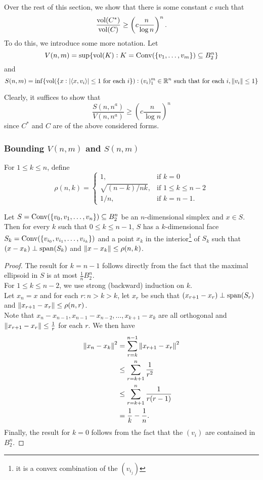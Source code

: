 Over the rest of this section, we show that there is some constant $c$ such that
\[ \frac{\operatorname{vol}(C^*)}{\operatorname{vol}(C)} \geq \left(c \frac{n}{\log n}\right)^n. \]
To do this, we introduce some more notation. Let
\[ V(n,m) = \sup\{\operatorname{vol}(K):K=\operatorname{Conv}(\{v_1,\ldots,v_m\})\subseteq B_2^n\} \]
and
\[ S(n,m) = \inf\{\operatorname{vol}(\{x:|\langle x,v_i\rangle| \leq 1\text{ for each $i$}\}) : (v_i)_1^m\in\mathbb{R}^n\text{ such that for each }i, \left\lVert v_i\right\rVert\leq 1\} \]

Clearly, it suffices to show that
\begin{equation}
\label{eqn: barany furedy}
	\frac{S(n,n^a)}{V(n,n^a)} \geq \left(c \frac{n}{\log n}\right)^n
\end{equation}
since $C^*$ and $C$ are of the above considered forms.\\

\subsubsection{Bounding \texorpdfstring{$V(n,m)$}{V(nm)} and \texorpdfstring{$S(n,m)$}{S(nm)}}

For $1\leq k\leq n$, define
\[
\rho(n,k) = 
\begin{cases}
1, & \text{if }k=0 \\
\sqrt{(n-k)/nk}, & \text{if }1\leq k\leq n-2 \\
1/n, & \text{if }k=n-1.
\end{cases}
\]

\begin{lemma}
\label{rho span bound}
Let $S=\operatorname{Conv}(\{v_0,v_1,\ldots,v_n\})\subseteq B_2^n$ be an $n$-dimensional simplex and $x\in S$. Then for every $k$ such that $0\leq k\leq n-1$, $S$ has a $k$-dimensional face $S_k = \operatorname{Conv}(\{v_{i_0},v_{i_1},\ldots,v_{i_k}\})$ and a point $x_k$ in the interior\footnote{it is a convex combination of the $(v_{i_j})$} of $S_k$ such that $(x-x_k) \perp \operatorname{span}(S_k)$ and $\left\lVert x-x_k\right\rVert\leq \rho(n,k)$.
\end{lemma}

\begin{proof}
The result for $k=n-1$ follows directly from the fact that the maximal ellipsoid in $S$ is at most $\frac{1}{n}B_2^n$.\\
For $1\leq k\leq n-2$, we use strong (backward) induction on $k$.\\
Let $x_n=x$ and for each $r:n>k>k$, let $x_r$ be such that $(x_{r+1}-x_r)\perp \operatorname{span}(S_r)$ and $\left\lVert x_{r+1}-x_r\right\rVert \leq \rho(n,r)$.\\
Note that $x_n - x_{n-1}, x_{n-1}-x_{n-2},\ldots,x_{k+1}-x_{k}$ are all orthogonal and $\left\lVert x_{r+1} - x_r\right\rVert\leq\frac{1}{r}$ for each $r$. We then have
\begin{align*}
	\left\lVert x_n - x_k\right\rVert^2 &= \sum_{r=k}^{n-1} \left\lVert x_{r+1}-x_r\right\rVert^2 \\
	&\leq \sum_{r=k+1}^{n} \frac{1}{r^2} \\
	&\leq \sum_{r=k+1}^{n} \frac{1}{r(r-1)} \\
	&= \frac{1}{k} - \frac{1}{n}.
\end{align*}
Finally, the result for $k=0$ follows from the fact that the $(v_i)$ are contained in $B_2^n$.
\end{proof}


